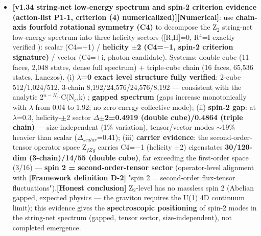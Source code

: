 \documentclass[12pt]{article}
\newcommand{\mtag}[1]{\textbf{[#1]}}
\newcommand{\up}[1]{\ensuremath{^{#1}}}
\newcommand{\down}[1]{\ensuremath{_{#1}}}
\begin{document}
\begin{itemize}
\item \textbf{\mtag{v1.34 string-net low-energy spectrum and spin-2 criterion evidence (action-list P1-1, criterion (4) numericalized)}}\mtag{Numerical}: use \textbf{chain-axis fourfold rotational symmetry (C4)} to decompose the Z\down{2} string-net low-energy spectrum into three helicity sectors ([R,H]=0, R\up{4}=I exactly verified \checkmark): scalar (C4=+1) / \textbf{helicity \ensuremath{\pm}2 (C4=\ensuremath{-}1, spin-2 criterion signature)} / vector (C4=\ensuremath{\pm}i, photon candidate). Systems: double cube (11 faces, 2,048 states, dense full spectrum) + triple-cube chain (16 faces, 65,536 states, Lanczos). (i) \textbf{\ensuremath{\lambda}=0 exact level structure fully verified}: 2-cube 512/1,024/512, 3-chain 8,192/24,576/24,576/8,192 --- consistent with the analytic 2\up{n-N\down{c}}\ensuremath{\cdot}C(N\down{c},k) \checkmark; \textbf{gapped spectrum} (gaps increase monotonically with \ensuremath{\lambda} from 0.04 to 1.92; no zero-energy collective mode); (ii) \textbf{spin-2 gap}: at \ensuremath{\lambda}=0.3, helicity-\ensuremath{\pm}2 sector \textbf{\ensuremath{\Delta}\ensuremath{\pm}2=0.4919 (double cube)/0.4864 (triple chain)} --- size-independent (1\% variation), tensor/vector modes \ensuremath{\sim}19\% heavier than scalar (\ensuremath{\Delta}\down{scalar}=0.41); (iii) \textbf{carrier evidence}: the second-order-tensor operator space Z\down{fZ}\down{g} carries C4=\ensuremath{-}1 (helicity \ensuremath{\pm}2) eigenstates \textbf{30/120-dim (3-chain)/14/55 (double cube)}, far exceeding the first-order space (3/16) --- \textbf{spin 2 = second-order-tensor sector} (operator-level alignment with \mtag{Framework definition D-2} "spin 2 = second-order flux-tensor fluctuations").\mtag{Honest conclusion} Z\down{2}-level has no massless spin 2 (Abelian gapped, expected physics --- the graviton requires the U(1) 4D continuum limit); this evidence gives the \textbf{spectroscopic positioning} of spin-2 modes in the string-net spectrum (gapped, tensor sector, size-independent), not completed emergence.
\end{itemize}
\end{document}
